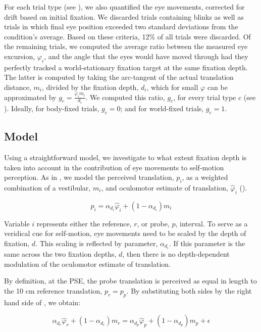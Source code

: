 For each trial type (see ), we also quantified the eye movements, corrected for drift based on initial fixation. We discarded trials containing blinks as well as trials in which final eye position exceeded two standard deviations from the condition's average. Based on these criteria, 12\% of all trials were discarded. Of the remaining trials, we computed the average ratio between the measured eye excursion, $\varphi_i$, and the angle that  the eyes would have  moved through had they perfectly tracked a world-stationary fixation target at the same fixation depth. The latter is computed by taking the arc-tangent of the actual translation distance, $m_i$, divided by the fixation depth, $d_i$, which for small $\varphi$ can be approximated by $g_c = \frac{\varphi_i m_i}{d_i}$. We computed this ratio, $g_c$, for every trial type $c$ (see ). Ideally, for body-fixed trials, $g_c = 0$; and for world-fixed trials, $g_c = 1$.


\subsection{Model}

Using a straightforward model, we investigate to what extent fixation depth is taken into account in the contribution of eye movements to self-motion perception. As in , we model the perceived translation, $p_i$, as a weighted combination of a vestibular, $m_i$, and oculomotor estimate of translation, $\hat{\varphi}_i$ ().

\begin{equation}
\label{p4:eq4}
p_i = \alpha_{d_i} \hat{\varphi}_i + (1 - \alpha_{d_i}) m_i
\end{equation}

Variable $i$ represents either the reference, $r$, or probe, $p$, interval. To serve as a veridical cue for self-motion, eye movements need to be scaled by the depth of fixation, $d$. This scaling is reflected by parameter, $\alpha_{d_i}$. If this parameter is the same across the two fixation depths, $d$, then there is no depth-dependent modulation of the oculomotor estimate of translation.

By definition, at the PSE, the probe translation is perceived as equal in length to the 10 cm reference translation, $p_r = p_p$. By substituting both sides by the right hand side of , we obtain:

\begin{equation}
\label{p4:eq5}
\alpha_{d_r} \hat{\varphi}_r + (1 - \alpha_{d_r}) m_r = \alpha_{d_p} \hat{\varphi}_p + (1 - \alpha_{d_p}) m_p + \epsilon
\end{equation}

